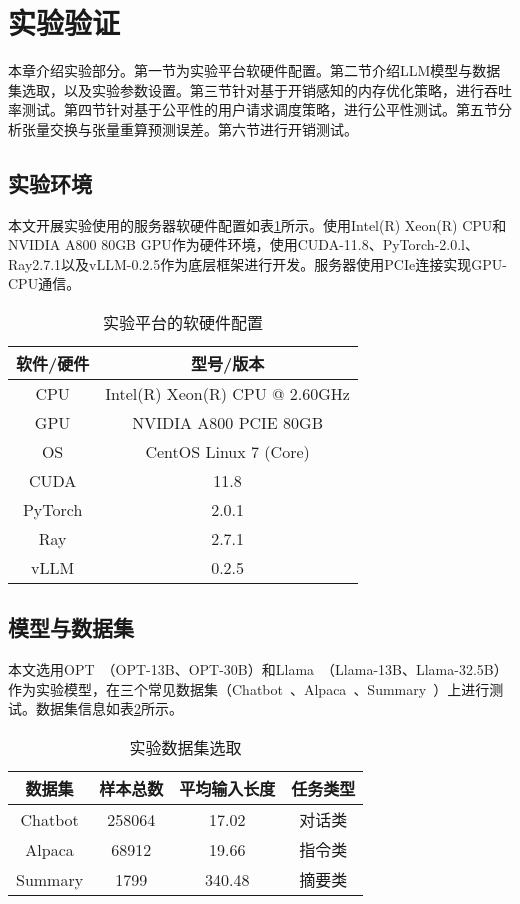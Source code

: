 \section{实验验证}

本章介绍实验部分。第一节为实验平台软硬件配置。第二节介绍LLM模型与数据集选取，以及实验参数设置。第三节针对基于开销感知的内存优化策略，进行吞吐率测试。第四节针对基于公平性的用户请求调度策略，进行公平性测试。第五节分析张量交换与张量重算预测误差。第六节进行开销测试。

\subsection{实验环境}

本文开展实验使用的服务器软硬件配置如表\ref{Table:实验平台的软硬件配置}所示。使用Intel(R) Xeon(R) CPU和NVIDIA A800 80GB GPU作为硬件环境，使用CUDA-11.8、PyTorch-2.0.l、Ray2.7.1以及vLLM-0.2.5作为底层框架进行开发。服务器使用PCIe连接实现GPU-CPU通信。

\begin{table}[H]
  \centering
  \caption{实验平台的软硬件配置}
  \label{Table:实验平台的软硬件配置}
  \renewcommand{\arraystretch}{1.25}
  \small
  \begin{tabular}{c c}
    \toprule
    \textbf{软件/硬件} & \textbf{型号/版本} \\ 
    \midrule
    CPU & Intel(R) Xeon(R) CPU @ 2.60GHz  \\ 
    GPU & NVIDIA A800 PCIE 80GB \\ 
    OS & CentOS Linux 7 (Core) \\ 
    CUDA & 11.8 \\ 
    PyTorch & 2.0.1 \\ 
    Ray & 2.7.1 \\
    vLLM & 0.2.5 \\ 
    \bottomrule
  \end{tabular}
\end{table}

\subsection{模型与数据集}

本文选用OPT~\cite{OPT}（OPT-13B、OPT-30B）和Llama~\cite{Llama}（Llama-13B、Llama-32.5B）作为实验模型，在三个常见数据集（Chatbot~\cite{Chatbot}、Alpaca~\cite{Alpaca}、Summary~\cite{Summary}）上进行测试。数据集信息如表\ref{Table:实验数据集选取}所示。

\begin{table}[H]
  \centering
  \caption{实验数据集选取}
  \label{Table:实验数据集选取}
  \renewcommand{\arraystretch}{1.25}
  \small
  \begin{tabular}{c c c c}
    \toprule
    \textbf{数据集} & \textbf{样本总数} & \textbf{平均输入长度} & \textbf{任务类型} \\
    \midrule
    Chatbot & 258064 & 17.02 & 对话类 \\
    Alpaca & 68912 & 19.66 & 指令类 \\
    Summary & 1799 & 340.48 & 摘要类 \\
    \bottomrule
  \end{tabular}
\end{table}


